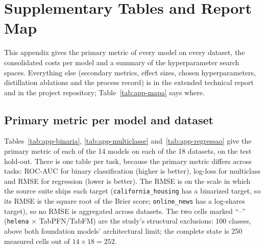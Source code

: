 \chapter{Supplementary Tables and Report Map}
\label{app:suplementares}

This appendix gives the primary metric of every model on every
dataset, the consolidated costs per model and a summary of the
hyperparameter search spaces. Everything else (secondary metrics,
effect sizes, chosen hyperparameters, distillation ablations and the
process record) is in the extended technical report and in the
project repository; Table~\ref{tab:app-mapa} says where.

\section{Primary metric per model and dataset}
\label{app:tabelas}

Tables~\ref{tab:app-binaria}, \ref{tab:app-multiclasse}
and~\ref{tab:app-regressao} give the primary metric of each of the 14
models on each of the 18 datasets, on the test hold-out. There is one table
per task, because the primary metric differs across tasks: ROC-AUC
for binary classification (higher is better), log-loss for multiclass
and RMSE for regression (lower is better). The RMSE is on the scale in
which the source suite ships each target
(\texttt{california\_\allowbreak housing} has a binarized target, so
its RMSE is the square root of the Brier score;
\texttt{online\_news} has a log-shares target), so no RMSE is
aggregated across datasets. The two cells marked ``--''
(\texttt{helena} $\times$ TabPFN/TabFM) are the study's structural
exclusions: 100 classes, above both foundation models' architectural
limit; the complete state is 250 measured cells out of
$14 \times 18 = 252$.


